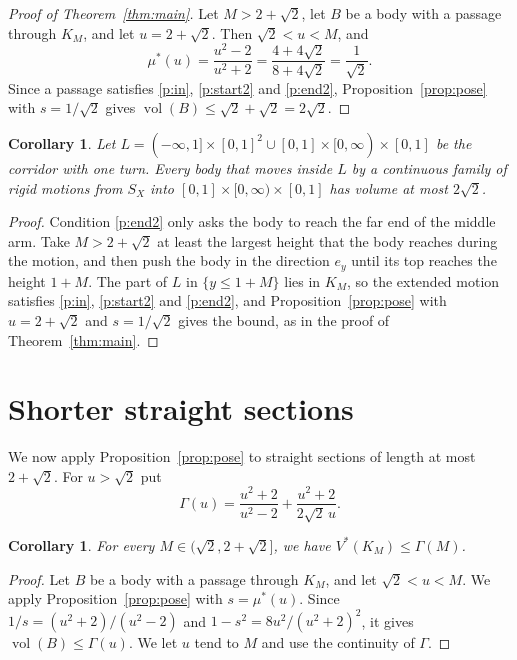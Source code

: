 \documentclass[11pt]{amsart}
\newtheorem{corollary}[theorem]{Corollary}
\theoremstyle{definition}
\theoremstyle{remark}
\numberwithin{equation}{section}
\newcommand{\vol}{\operatorname{vol}}
\begin{document}
\begin{proof}[Proof of Theorem~\ref{thm:main}]
Let $M>2+\sqrt2$, let $B$ be a body with a passage through $K_M$, and let $u=2+\sqrt2$. Then $\sqrt2<u<M$, and
\[
\mu^*(u)=\frac{u^2-2}{u^2+2}=\frac{4+4\sqrt2}{8+4\sqrt2}=\frac1{\sqrt2}.
\]
Since a passage satisfies \ref{p:in}, \ref{p:start2} and \ref{p:end2}, Proposition~\ref{prop:pose} with $s=1/\sqrt2$ gives $\vol(B)\le\sqrt2+\sqrt2=2\sqrt2$.
\end{proof}

\begin{corollary}\label{cor:oneturn}
Let $L=(-\infty,1]\times[0,1]^2\cup[0,1]\times[0,\infty)\times[0,1]$ be the corridor with one turn. Every body that moves inside $L$ by a continuous family of rigid motions from $S_X$ into $[0,1]\times[0,\infty)\times[0,1]$ has volume at most $2\sqrt2$.
\end{corollary}

\begin{proof}
Condition \ref{p:end2} only asks the body to reach the far end of the middle arm. Take $M>2+\sqrt2$ at least the largest height that the body reaches during the motion, and then push the body in the direction $e_y$ until its top reaches the height $1+M$. The part of $L$ in $\{y\le1+M\}$ lies in $K_M$, so the extended motion satisfies \ref{p:in}, \ref{p:start2} and \ref{p:end2}, and Proposition~\ref{prop:pose} with $u=2+\sqrt2$ and $s=1/\sqrt2$ gives the bound, as in the proof of Theorem~\ref{thm:main}.
\end{proof}

\section{Shorter straight sections}\label{sec:more}

We now apply Proposition~\ref{prop:pose} to straight sections of length at most $2+\sqrt2$. For $u>\sqrt2$ put
\[
\Gamma(u)=\frac{u^2+2}{u^2-2}+\frac{u^2+2}{2\sqrt2\,u}.
\]

\begin{corollary}\label{cor:short}
For every $M\in(\sqrt2,2+\sqrt2]$, we have $V^*(K_M)\le\Gamma(M)$.
\end{corollary}

\begin{proof}
Let $B$ be a body with a passage through $K_M$, and let $\sqrt2<u<M$. We apply Proposition~\ref{prop:pose} with $s=\mu^*(u)$. Since $1/s=(u^2+2)/(u^2-2)$ and $1-s^2=8u^2/(u^2+2)^2$, it gives $\vol(B)\le\Gamma(u)$. We let $u$ tend to $M$ and use the continuity of $\Gamma$.
\end{proof}
\end{document}
